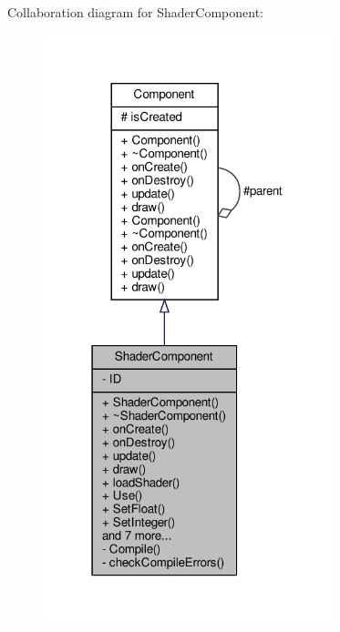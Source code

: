 Collaboration diagram for Shader\+Component\+:
\nopagebreak
\begin{figure}[H]
\begin{center}
\leavevmode
\includegraphics[width=238pt]{classShaderComponent__coll__graph}
\end{center}
\end{figure}
